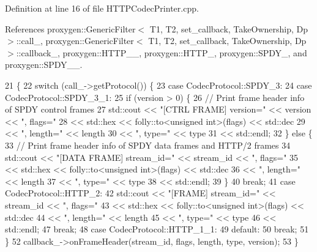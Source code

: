 Definition at line 16 of file H\+T\+T\+P\+Codec\+Printer.\+cpp.



References proxygen\+::\+Generic\+Filter$<$ T1, T2, set\+\_\+callback, Take\+Ownership, Dp $>$\+::call\+\_\+, proxygen\+::\+Generic\+Filter$<$ T1, T2, set\+\_\+callback, Take\+Ownership, Dp $>$\+::callback\+\_\+, proxygen\+::\+H\+T\+T\+P\+\_\+\_, proxygen\+::\+H\+T\+T\+P\+\_, proxygen\+::\+S\+P\+D\+Y\+\_, and proxygen\+::\+S\+P\+D\+Y\+\_\+\_.


\begin{DoxyCode}
21                       \{
22   \textcolor{keywordflow}{switch} (call_->getProtocol()) \{
23     \textcolor{keywordflow}{case} CodecProtocol::SPDY_3:
24     \textcolor{keywordflow}{case} CodecProtocol::SPDY_3_1:
25       \textcolor{keywordflow}{if} (version > 0) \{
26         \textcolor{comment}{// Print frame header info of SPDY control frames}
27         std::cout << \textcolor{stringliteral}{"[CTRL FRAME] version="} << version << \textcolor{stringliteral}{", flags="}
28                   <<  std::hex << folly::to<unsigned int>(flags) << std::dec
29                   << \textcolor{stringliteral}{", length="} << length
30                   << \textcolor{stringliteral}{", type="} << type
31                   << std::endl;
32       \} \textcolor{keywordflow}{else} \{
33         \textcolor{comment}{// Print frame header info of SPDY data frames and HTTP/2 frames}
34         std::cout << \textcolor{stringliteral}{"[DATA FRAME] stream\_id="} << stream\_id << \textcolor{stringliteral}{", flags="}
35                   << std::hex << folly::to<unsigned int>(flags) << std::dec
36                   << \textcolor{stringliteral}{", length="} << length
37                   << \textcolor{stringliteral}{", type="} << type
38                   << std::endl;
39       \}
40       \textcolor{keywordflow}{break};
41     \textcolor{keywordflow}{case} CodecProtocol::HTTP_2:
42       std::cout << \textcolor{stringliteral}{"[FRAME] stream\_id="} << stream\_id << \textcolor{stringliteral}{", flags="}
43                 << std::hex << folly::to<unsigned int>(flags) << std::dec
44                 << \textcolor{stringliteral}{", length="} << length
45                 << \textcolor{stringliteral}{", type="} << type
46                 << std::endl;
47       \textcolor{keywordflow}{break};
48     \textcolor{keywordflow}{case} CodecProtocol::HTTP_1_1:
49     \textcolor{keywordflow}{default}:
50       \textcolor{keywordflow}{break};
51   \}
52   callback_->onFrameHeader(stream\_id, flags, length, type, version);
53 \}
\end{DoxyCode}
